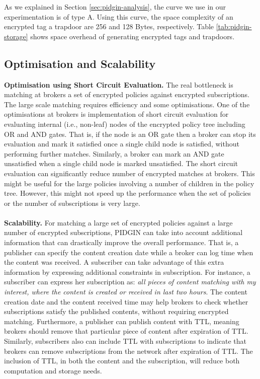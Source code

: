 \documentclass[epsfig,a4paper,11pt,titlepage]{book}
\numberwithin{algorithm}{chapter}
\begin{document}
As we explained in Section \ref{sec:pidgin-analysis}, the curve we use in our experimentation is of type A. Using this curve, the space complexity of an encrypted tag a trapdoor are 256 and 128 Bytes, respectively. Table \ref{tab:pidgin-storage} shows space overhead of generating encrypted tags and trapdoors.

\subsection{Optimisation and Scalability}
\label{sec:pidgin-optimisation}

\noindent \textbf{Optimisation using Short Circuit Evaluation.} The real bottleneck is matching at brokers a set of encrypted policies against encrypted subscriptions. The large scale matching requires efficiency and some optimisations. One of the optimisations at brokers is implementation of short circuit evaluation for evaluating internal (i.e., non-leaf) nodes of the encrypted policy tree including OR and AND gates. That is, if the node is an OR gate then a broker can stop its evaluation and mark it satisfied once a single child node is satisfied, without performing further matches. Similarly, a broker can mark an AND gate unsatisfied when a single child node is marked unsatisfied. The short circuit evaluation can significantly reduce number of encrypted matches at brokers. This might be useful for the large policies involving a number of children in the policy tree. However, this might not speed up the performance when the set of policies or the number of subscriptions is very large. \\ \\
\noindent \textbf{Scalability.} For matching a large set of encrypted policies against a large number of encrypted subscriptions, \gls{PIDGIN} can take into account additional information that can drastically improve the overall performance. That is, a publisher can specify the content creation date while a broker can log time when the content was received. A subscriber can take advantage of this extra information by expressing additional constraints in subscription. For instance, a subscriber can express her subscription as: \emph{all pieces of content matching with my interest, where the content is created or received in last two hours}. The content creation date and the content received time may help brokers to check whether subscriptions satisfy the published contents, without requiring encrypted matching. Furthermore, a publisher can publish content with \gls{TTL}, meaning brokers should remove that particular piece of content after expiration of \gls{TTL}. Similarly, subscribers also can include \gls{TTL} with subscriptions to indicate that brokers can remove subscriptions from the network after expiration of \gls{TTL}. The inclusion of \gls{TTL}, in both the content and the subscription, will reduce both computation and storage needs.
\end{document}
